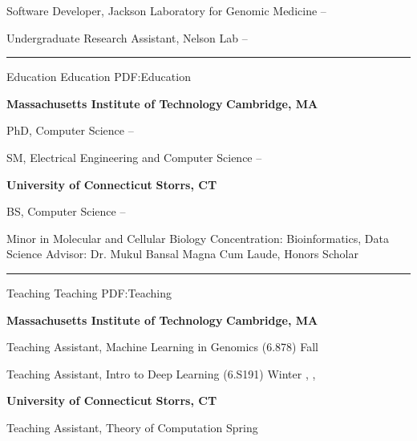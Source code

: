 \documentclass[letterpaper,MMMyyyy,nonstopmode]{simpleresumecv}
\begin{document}
\begin{Body}
\Gap
\Item Software Developer, Jackson Laboratory for Genomic Medicine
\hfill
{} --

\Gap
\Item Undergraduate Research Assistant, Nelson Lab
\hfill
{} --

\BigGap
\hrule
\Section
{Education}
{Education}
{PDF:Education}

\Entry
\textbf{Massachusetts Institute of Technology}
\hfill \textbf{Cambridge, MA}

\Gap
\Item PhD, Computer Science
\hfill
{} --
\Gap
\begin{Detail}
\end{Detail}
\Gap

\Item SM, Electrical Engineering and Computer Science
\hfill
{} --
\BigGap

\Entry
\textbf{University of Connecticut}
\hfill \textbf{Storrs, CT}

\Gap
\Item BS, Computer Science
\hfill
{} --
\Gap
\begin{Detail}
\SubBulletItem Minor in Molecular and Cellular Biology
\SubBulletItem Concentration: Bioinformatics, Data Science
\SubBulletItem Advisor: Dr. Mukul Bansal
\SubBulletItem Magna Cum Laude, Honors Scholar
\end{Detail}


\BigGap
\hrule
\Section
{Teaching}
{Teaching}
{PDF:Teaching}

\Entry
{\textbf{Massachusetts Institute of Technology}}
\hfill \textbf{Cambridge, MA}

\Gap
\Item Teaching Assistant, Machine Learning in Genomics (6.878)
\hfill
Fall 

\Gap
\Item Teaching Assistant, Intro to Deep Learning (6.S191)
\hfill
Winter , , 

\BigGap
\Entry
{\textbf{University of Connecticut}}
\hfill \textbf{Storrs, CT}

\Gap
\Item Teaching Assistant, Theory of Computation
\hfill
Spring 


\end{Body}
\end{document}
